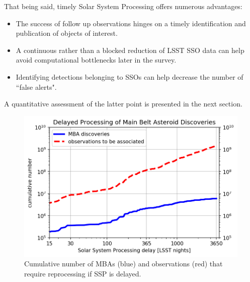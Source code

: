 That being said, timely Solar System Processing offers numerous advantages:
\begin{itemize}
\item The success of follow up observations hinges on a timely identification and publication of objects of interest.
\item A continuous rather than a blocked reduction of \gls{LSST} \gls{SSO} data can help avoid computational bottlenecks later in the survey.
\item Identifying detections belonging to SSOs can help decrease the number of ``false alerts".
\end{itemize}
A quantitative assessment of the latter point is presented in the next section.
%
\begin{figure}[tb!]
\begin{center}
\includegraphics[width=0.70\linewidth]{figs/reprocessing4.png}
\caption{Cumulative number of MBAs (blue) and observations (red) that require reprocessing if \gls{SSP} is delayed. }
\end{center}
\label{fig:rep}       %
\end{figure}

\clearpage

